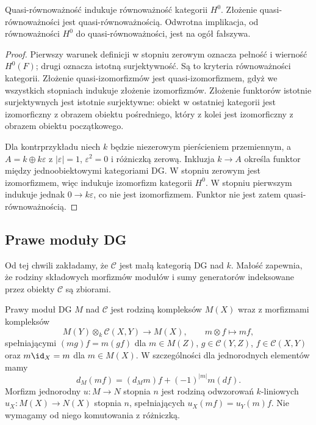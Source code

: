 \begin{stwierdzenie}\label{cat:prop:dg-quasi-equivalence-h0}
Quasi-równoważność indukuje równoważność kategorii $H^0$. Złożenie quasi-równoważności jest quasi-równoważnością. Odwrotna implikacja, od równoważności $H^0$ do quasi-równoważności, jest na ogół fałszywa.
\end{stwierdzenie}
\begin{proof}
Pierwszy warunek definicji w stopniu zerowym oznacza pełność i wierność $H^0(F)$; drugi oznacza istotną surjektywność. Są to kryteria równoważności kategorii. Złożenie quasi-izomorfizmów jest quasi-izomorfizmem, gdyż we wszystkich stopniach indukuje złożenie izomorfizmów. Złożenie funktorów istotnie surjektywnych jest istotnie surjektywne: obiekt w ostatniej kategorii jest izomorficzny z obrazem obiektu pośredniego, który z kolei jest izomorficzny z obrazem obiektu początkowego.

Dla kontrprzykładu niech $k$ będzie niezerowym pierścieniem przemiennym, a $A=k\oplus k\varepsilon$ z $|\varepsilon|=1$, $\varepsilon^2=0$ i różniczką zerową. Inkluzja $k\to A$ określa funktor między jednoobiektowymi kategoriami DG. W stopniu zerowym jest izomorfizmem, więc indukuje izomorfizm kategorii $H^0$. W stopniu pierwszym indukuje jednak $0\to k\varepsilon$, co nie jest izomorfizmem. Funktor nie jest zatem quasi-równoważnością.
\end{proof}

\subsection{Prawe moduły DG}

Od tej chwili zakładamy, że $\mathcal C$ jest małą kategorią DG nad $k$. Małość zapewnia, że rodziny składowych morfizmów modułów i sumy generatorów indeksowane przez obiekty $\mathcal C$ są zbiorami.

\begin{definicja}\label{cat:def:dg-module}
Prawy moduł DG $M$ nad $\mathcal C$ jest rodziną kompleksów $M(X)$ wraz z morfizmami kompleksów
\[
 M(Y)\otimes_k\mathcal C(X,Y)\longrightarrow M(X),
 \qquad m\otimes f\longmapsto mf,
\]
spełniającymi $(mg)f=m(gf)$ dla $m\in M(Z)$, $g\in\mathcal C(Y,Z)$, $f\in\mathcal C(X,Y)$ oraz $m\id_X=m$ dla $m\in M(X)$. W szczególności dla jednorodnych elementów mamy
\[
 d_M(mf)=(d_Mm)f+(-1)^{|m|}m(df).
\]
Morfizm jednorodny $u:M\to N$ stopnia $n$ jest rodziną odwzorowań $k$-liniowych $u_X:M(X)\to N(X)$ stopnia $n$, spełniających $u_X(mf)=u_Y(m)f$. Nie wymagamy od niego komutowania z różniczką.
\end{definicja}

